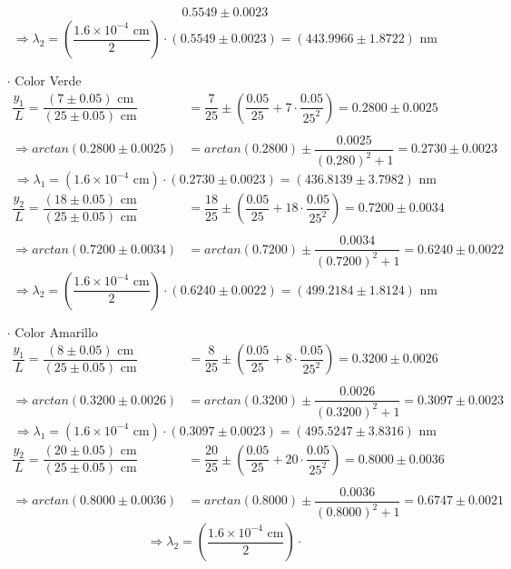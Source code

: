 \documentclass[12pt,a4paper]{article}
\begin{document}
\begin{itemize}
\begin{align*}
0.5549\pm 0.0023
\end{align*}
$$\Longrightarrow \lambda_2=
\left(\dfrac{1.6\times 10^{-4}\mbox{ cm}}{2}\right)\cdot
(0.5549\pm 0.0023 )=(443.9966\pm 1.8722)\mbox{ nm}$$
\item [$\cdot$] Color Verde
\begin{align*}
\dfrac{y_1}{L}=\dfrac{(7\pm 0.05)\mbox{ cm}}{(25\pm 0.05)\mbox{ cm}}&=
\dfrac{7}{25}\pm\left(\dfrac{0.05}{25}+7\cdot\dfrac{0.05}{25^2}\right)=
0.2800\pm0.0025 \\\\
\Longrightarrow arctan(0.2800\pm0.0025)&=
arctan(0.2800)\pm\dfrac{0.0025}{(0.280)^2+1}=
0.2730\pm0.0023 
\end{align*}
$$\Longrightarrow \lambda_1=
(1.6\times 10^{-4}\mbox{ cm})\cdot
(0.2730\pm0.0023)=(436.8139\pm3.7982 )\mbox{ nm}$$
\begin{align*}
\dfrac{y_2}{L}=\dfrac{(18\pm 0.05)\mbox{ cm}}{(25\pm 0.05)\mbox{ cm}}&=
\dfrac{18}{25}\pm\left(\dfrac{0.05}{25}+18\cdot\dfrac{0.05}{25^2}\right)=
0.7200\pm0.0034 \\\\
\Longrightarrow arctan(0.7200\pm0.0034)&=
arctan(0.7200)\pm\dfrac{0.0034}{(0.7200)^2+1}=
0.6240\pm0.0022
\end{align*}
$$\Longrightarrow \lambda_2=
\left(\dfrac{1.6\times 10^{-4}\mbox{ cm}}{2}\right)\cdot
(0.6240\pm0.0022 )=(499.2184\pm 1.8124)\mbox{ nm}$$
\item [$\cdot$] Color Amarillo
\begin{align*}
\dfrac{y_1}{L}=\dfrac{(8\pm 0.05)\mbox{ cm}}{(25\pm 0.05)\mbox{ cm}}&=
\dfrac{8}{25}\pm\left(\dfrac{0.05}{25}+8\cdot\dfrac{0.05}{25^2}\right)=
0.3200\pm0.0026 \\\\
\Longrightarrow arctan(0.3200\pm0.0026)&=
arctan(0.3200)\pm\dfrac{0.0026}{(0.3200)^2+1}=
0.3097\pm 0.0023
\end{align*}
$$\Longrightarrow \lambda_1=
(1.6\times 10^{-4}\mbox{ cm})\cdot
(0.3097\pm 0.0023 )=(495.5247\pm3.8316 )\mbox{ nm}$$
\begin{align*}
\dfrac{y_2}{L}=\dfrac{(20\pm 0.05)\mbox{ cm}}{(25\pm 0.05)\mbox{ cm}}&=
\dfrac{20}{25}\pm\left(\dfrac{0.05}{25}+20\cdot\dfrac{0.05}{25^2}\right)=
0.8000\pm0.0036 \\\\
\Longrightarrow arctan(0.8000\pm0.0036)&=
arctan(0.8000)\pm\dfrac{0.0036}{(0.8000)^2+1}=
0.6747\pm0.0021 
\end{align*}
$$\Longrightarrow \lambda_2=
\left(\dfrac{1.6\times 10^{-4}\mbox{ cm}}{2}\right)\cdot
$$
\end{itemize}
\end{document}
